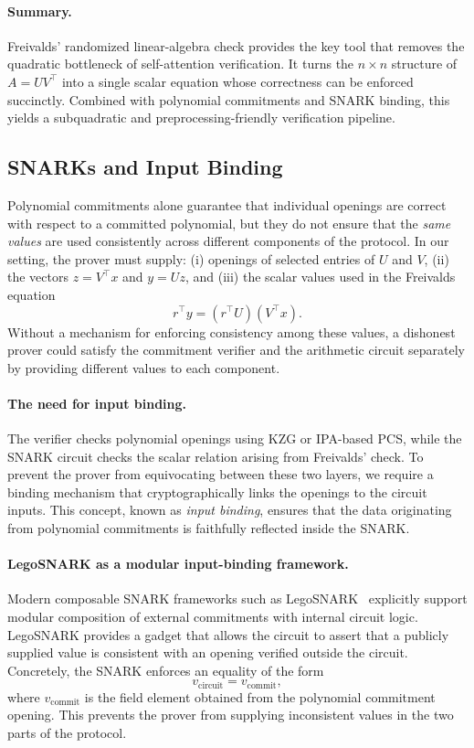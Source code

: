 \documentclass[11pt]{article}
\begin{document}
\paragraph{Summary.}
Freivalds' randomized linear-algebra check provides the key tool that 
removes the quadratic bottleneck of self-attention verification.
It turns the $n \times n$ structure of $A = U V^\top$ into a single 
scalar equation whose correctness can be enforced succinctly.
Combined with polynomial commitments and SNARK binding, this yields a 
subquadratic and preprocessing-friendly verification pipeline.

\subsection{SNARKs and Input Binding}

Polynomial commitments alone guarantee that individual openings are
correct with respect to a committed polynomial, but they do not ensure
that the \emph{same values} are used consistently across different
components of the protocol.
In our setting, the prover must supply:
(i) openings of selected entries of $U$ and $V$,  
(ii) the vectors $z = V^\top x$ and $y = U z$, and  
(iii) the scalar values used in the Freivalds equation
\[
  r^\top y = (r^\top U)(V^\top x).
\]
Without a mechanism for enforcing consistency among these values, a
dishonest prover could satisfy the commitment verifier and the arithmetic
circuit separately by providing different values to each component.

\paragraph{The need for input binding.}
The verifier checks polynomial openings using KZG or IPA-based PCS,
while the SNARK circuit checks the scalar relation arising from
Freivalds' check.
To prevent the prover from equivocating between these two layers,
we require a binding mechanism that cryptographically links the
openings to the circuit inputs.
This concept, known as \emph{input binding}, ensures that the data
originating from polynomial commitments is faithfully reflected inside
the SNARK.

\paragraph{LegoSNARK as a modular input-binding framework.}
Modern composable SNARK frameworks such as LegoSNARK~\cite{campanelli2019legosnark}
explicitly support modular composition of external commitments with
internal circuit logic.
LegoSNARK provides a gadget that allows the circuit to assert that a
publicly supplied value is consistent with an opening verified outside
the circuit.
Concretely, the SNARK enforces an equality of the form
\[
  v_\text{circuit} = v_\text{commit},
\]
where $v_\text{commit}$ is the field element obtained from the
polynomial commitment opening.
This prevents the prover from supplying inconsistent values in the two
parts of the protocol.
\end{document}
